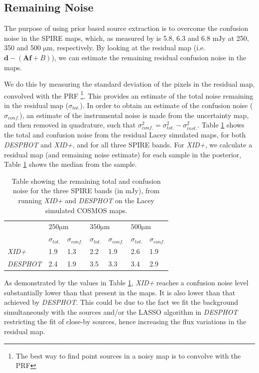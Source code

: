 \documentclass[useAMS,usenatbib]{mnras}
\begin{document}
\subsection{Remaining Noise}
The purpose of using prior based source extraction is to overcome the confusion noise in the SPIRE maps, which, as measured by \cite{Nguyen:2010} is 5.8, 6.3 and 6.8 $\mathrm{mJy}$ at 250, 350 and 500 $\mathrm{\mu m}$, respectively. By looking at the residual map (i.e. $\mathbf{d}-(\mathbf{Af}+B)$), we can estimate the remaining residual confusion noise in the maps.

We do this by measuring the standard deviation of the pixels in the residual map, convolved with the PRF \footnote{The best way to find point sources in a noisy map is to convolve with the PRF}. This provides an estimate of the total noise remaining in the residual map ($\sigma_{tot.}$). In order to obtain an estimate of the confusion noise ($\sigma_{conf.}$), an estimate of the instrumental noise is made from the uncertainty map, and then removed in quadrature, such that $\sigma_{conf.}^2 = \sigma_{tot.}^2 - \sigma_{inst.}^2$. Table \ref{tab:remaining_noise} shows the total and confusion noise from the residual Lacey simulated maps, for both \emph{DESPHOT} and \emph{XID+}, and for all three SPIRE bands. For \emph{XID+}, we calculate a residual map (and remaining noise estimate) for each sample in the posterior, Table \ref{tab:remaining_noise} shows the median from the sample.

\begin{table}
\centering
\begin{tabular}{l|l|l|l|l|l|l|}
\cline{2-7}
                                       & \multicolumn{2}{l|}{$250\mathrm{\mu m}$} & \multicolumn{2}{l|}{$350\mathrm{\mu m}$} & \multicolumn{2}{l|}{$500\mathrm{\mu m}$} \\ \cline{2-7} 
                                       & $\sigma_{tot.}$     & $\sigma_{conf.}$    & $\sigma_{tot.}$    & $\sigma_{conf.}$    & $\sigma_{tot.}$   & $\sigma_{conf.}$    \\ \hline
\multicolumn{1}{|l|}{\emph{XID+}}    & 1.9                   & 1.3                   & 2.2                   &  1.9                   & 2.6                   &  1.9                   \\ \hline
\multicolumn{1}{|l|}{\emph{DESPHOT}} & 2.4                   & 1.9                 & 3.5                  &  3.3                 &  3.4                  &  2.9                   \\ \hline
\end{tabular}
\caption{Table showing the remaining total and confusion noise for the three SPIRE bands (in $\mathrm{mJy}$), from running \emph{XID+} and \emph{DESPHOT} on the Lacey simulated COSMOS maps.}
\label{tab:remaining_noise}
\end{table}
As demonstrated by the values in Table \ref{tab:remaining_noise}, \emph{XID+} reaches a confusion noise level substantially lower than that present in the maps. It is also lower than that achieved by \emph{DESPHOT}. This could be due to the fact we fit the background simultaneously with the sources and/or the LASSO algorithm in \emph{DESPHOT} restricting the fit of close-by sources, hence increasing the flux variations in the residual map. 
\end{document}
